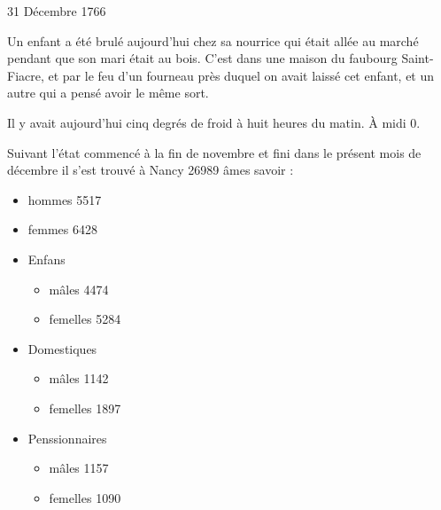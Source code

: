                      \begin{diary}{31 Décembre 1766}{}

                         Un enfant a été brulé aujourd'hui
                           chez sa nourrice qui était allée au marché
                           pendant que son mari était au bois. C’est
                           dans une maison du faubourg
                              Saint-Fiacre,
                           et par le feu d’un fourneau près duquel
                           on avait laissé cet enfant, et un autre
                           qui a pensé avoir le même sort. \bigskip


                         Il y avait aujourd'hui cinq degrés de
                              froid à huit heures du matin. À midi
                           0. \bigskip


                         Suivant l’état commencé à la fin de
                              novembre et fini dans le présent mois de
                              décembre il s’est trouvé à Nancy 26989 âmes
                           savoir : \begin{itemize}\item hommes 5517\item femmes 6428\item Enfans \begin{itemize}\item mâles 4474\item femelles 5284\end{itemize}

                              \item Domestiques
                                 \begin{itemize}\item mâles 1142\item femelles 1897\end{itemize}

                              \item Penssionnaires \begin{itemize}\item mâles 1157\item femelles 1090\end{itemize}
                              \end{itemize}
                        \bigskip


                     \end{diary}
